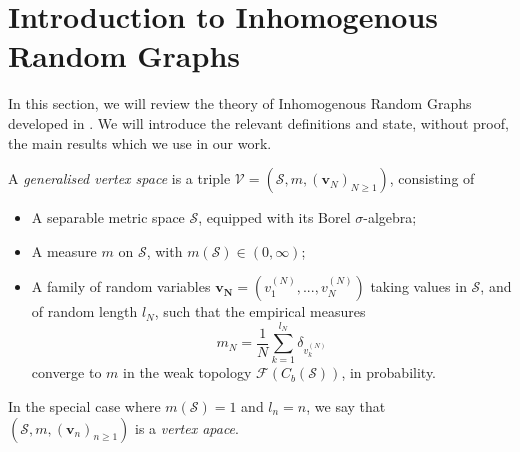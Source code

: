 
\section{Introduction to Inhomogenous Random Graphs}
In this section, we will review the theory of Inhomogenous Random Graphs developed in \cite{BJR07}. We will introduce the relevant definitions and state, without proof, the main results which we use in our work.
\begin{definition} \label{def: Generalised vertex space} A \emph{generalised vertex space} is a triple $\mathcal{V}=(\mathcal{S}, m, (\mathbf{v}_N)_{N\geq 1})$, consisting of \begin{itemize}
    \item A separable metric space $\mathcal{S}$, equipped with its Borel $\sigma$-algebra;
    \item A measure $m$ on $\mathcal{S}$, with $m(\mathcal{S}) \in (0, \infty)$; 
    \item A family of random variables $\mathbf{v_N}=(v^{(N)}_1,...,v^{(N)}_N)$ taking values in $\mathcal{S}$, and of random length $l_N$,  such that the empirical measures \begin{equation}
        m_N=\frac{1}{N}\sum_{k=1}^{l_N} \delta_{v^{(N)}_k} \end{equation} converge to $m$ in the weak topology $\mathcal{F}(C_b(\mathcal{S}))$, in probability.

\end{itemize} In the special case where $m(\mathcal{S})=1$ and $l_n=n$, we say that $(\mathcal{S}, m, (\mathbf{v}_n)_{n\geq 1})$ is a \emph{vertex apace}. \end{definition}  
